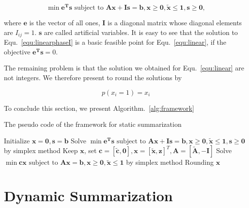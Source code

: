 \documentclass{llncs}
\begin{document}
\begin{equation}\label{equ:linearphaseI}
\min \mathbf{e^{T}s} \textrm{ subject to } \mathbf{Ax} + \mathbf{Is} = \mathbf{b}, \mathbf{x}\geq \mathbf{0},\tilde{\mathbf{x}} \leq \mathbf{1},\mathbf{s}\geq \mathbf{0},
\end{equation}

where $\mathbf{e}$ is the vector of all ones, $\mathbf{I}$ is a diagonal matrix whose diagonal elements are $I_{ij}=1$. $\mathbf{s}$ are called artificial variables. It is easy to see that the solution to Equ.~\ref{equ:linearphaseI} is a basic feasible point for Equ.~\ref{equ:linear}, if the objective $\mathbf{e^{T}s}=0 $. 

The remaining problem is that the solution we obtained for Equ.~\ref{equ:linear} are not integers. We therefore present to round the solutions by

\begin{equation}
p(x_i=1)= x_i 
\end{equation}


To conclude this section, we present Algorithm.~\ref{alg:framework}

\begin{algorithm}\label{alg:framework}
\caption{The pseudo code of the framework for static summarization}

Initialize $\mathbf{x}=\mathbf{0},\mathbf{s}=\mathbf{b}$\;
Solve $\min \mathbf{e^{T}s} \textrm{ subject to } \mathbf{Ax} + \mathbf{Is} = \mathbf{b}, \mathbf{x}\geq \mathbf{0},\tilde{\mathbf{x}} \leq \mathbf{1},\mathbf{s}\geq \mathbf{0}$ by simplex method\;
Keep $\mathbf{x}$, set $\mathbf{c}=[\tilde{\mathbf{c}},\mathbf{0}],\mathbf{x}=[\tilde{\mathbf{x}},\mathbf{z}]^T,\mathbf{A}=[\tilde{\mathbf{A}},-\mathbf{I}]$ \;
Solve $\min \mathbf{cx} \textrm{ subject to } \mathbf{Ax} = \mathbf{b}, \mathbf{x}\geq \mathbf{0},\tilde{\mathbf{x}} \leq \mathbf{1}$ by simplex method\;
Rounding $\mathbf{x}$\;
\end{algorithm}



\section{Dynamic Summarization}\label{sec:dynamic}
\end{document}
